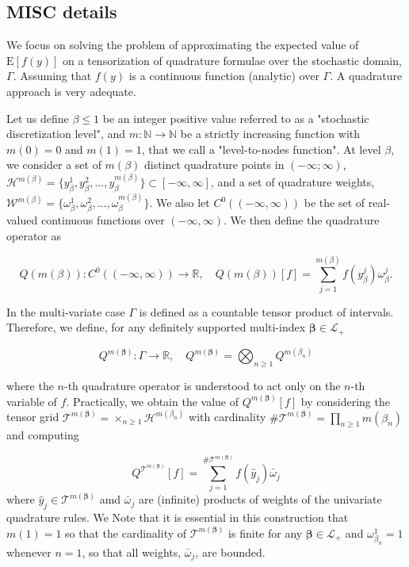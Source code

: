 \documentclass[11pt]{article}
\newcommand{\expt}[1]{\mathrm{E}\left[#1\right]}
\newcommand{\rset}{\mathbb{R}}
\newcommand{\nset}{\mathbb{N}}
\begin{document}
\subsection{MISC details} \label{sec:Details of the MISC}

We focus on solving the problem of  approximating the expected value of $\expt{f(y)}$ on a tensorization of quadrature formulae over the stochastic domain, $\Gamma$. Assuming that $f(y)$ is a continuous function (analytic) over $\Gamma$. A quadrature approach is very adequate.

Let us define $\beta \le 1$ be an integer positive value referred to as a "stochastic discretization level", and $m: \nset \rightarrow \nset$ be a strictly increasing function with $m(0)=0$ and $m(1)=1$, that we call a "level-to-nodes function". At level $\beta$, we consider a set of $m(\beta)$ distinct quadrature points in $(-\infty; \infty)$, $\mathcal{H}^{m(\beta)}=\{y^1_\beta,y^2_\beta,\dots,y_\beta^{m(\beta)}\} \subset [-\infty,\infty]$, and a set of quadrature weights, $\mathcal{W}^{m(\beta)}=\{\omega^1_\beta,\omega^2_\beta,\dots,\omega_\beta^{m(\beta)}\}$. We also let $C^0((-\infty,\infty))$ be the set of real-valued continuous functions over $(-\infty, \infty)$. We then define the quadrature operator as


\begin{equation}
Q(m(\beta)):C^0((-\infty,\infty)) \rightarrow \rset, \quad Q(m(\beta))[f]= \sum_{j=1}^{m(\beta)} f(y^j_\beta) \omega_\beta^j.
\end{equation}






In the multi-variate case $\Gamma$ is defined as a countable tensor
product of intervals. Therefore,  we define, for any definitely supported multi-index $\boldsymbol{\beta} \in \mathcal{L}_+$

$$Q^{m(\boldsymbol{\beta})}: \Gamma \rightarrow \rset,\quad  Q^{m(\boldsymbol{\beta})}= \bigotimes_{n \ge 1} Q^{m(\beta_n)} $$

where the $n$-th quadrature operator is understood to act only on the $n$-th variable of $f$. Practically, we obtain the value of $Q^{m(\boldsymbol{\beta})}[f]$  by considering the tensor grid $\mathcal{T}^{m(\boldsymbol{\beta})}= \times_{n \ge 1} \mathcal{H}^{m(\beta_n)}$ with cardinality $\#\mathcal{T}^{m(\boldsymbol{\beta})}=\prod_{n \ge 1} m (\beta_n)$ and computing

$$ Q^{\mathcal{T}^{m(\boldsymbol{\beta})}}[f]= \sum_{j=1}^{\#\mathcal{T}^{m(\boldsymbol{\beta})}} f(\hat{y}_j) \bar{\omega}_j$$
where $\hat{y}_j \in \mathcal{T}^{m(\boldsymbol{\beta})}$ amd $\bar{\omega}_j$ are (infinite) products of weights of the univariate quadrature rules. We Note that it is essential in this construction that $m(1)=1$ so that the cardinality of $\mathcal{T}^{m(\boldsymbol{\beta})}$ is finite for any $\boldsymbol{\beta} \in \mathcal{L}_+$ and $ \omega_{\beta_n}^1=1$ whenever $n = 1$, so that all weights, $\bar{\omega}_j$, are bounded.
\end{document}
